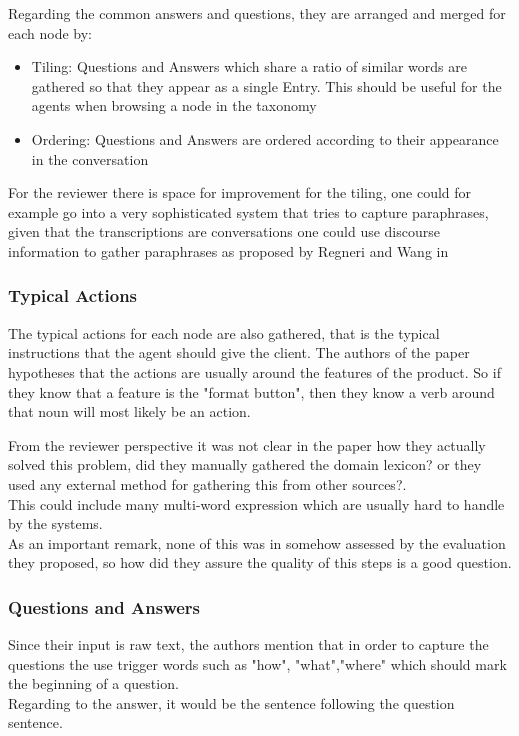 \documentclass[4pt,a4paper,twocolumn]{article}
\begin{document}
Regarding the common answers and questions, they are arranged and merged for each node by:
\begin{itemize}
	\item Tiling:  Questions and Answers which share a ratio of similar words are gathered so that they appear as a single
				  Entry. This should be useful for the agents when browsing a node in the taxonomy
	\item Ordering: Questions and Answers are ordered according to their appearance in the conversation
\end{itemize}


For the reviewer there is space for improvement for the tiling, one could for example go into a very sophisticated system that tries to capture paraphrases, given that the transcriptions are conversations one could use discourse information to gather paraphrases as proposed by Regneri and Wang in ~\cite{pub6382}

\subsubsection*{Typical Actions}
The typical actions for each node are also gathered, that is the typical instructions that the agent should give the client.
The authors of the paper hypotheses that the actions are usually around the features of the product. So if they know that a feature is the "format button", then they know a verb around that noun will most likely  be an action.

From the reviewer perspective it was not clear in the paper how they actually solved this problem, did they manually gathered the domain lexicon? or they used any external method for gathering this from other sources?.\\
This could include many multi-word expression which are usually hard to handle by the systems.\\
As an important remark, none of this was in somehow assessed by the evaluation they proposed, so how did they assure the quality of this steps is a  good question.


\subsubsection*{Questions and Answers}
Since their input is raw text, the authors mention that in order to capture the questions the use trigger words such as "how", "what","where" which should mark the beginning of a question.\\
Regarding to the answer, it would be the sentence following the question sentence.
\end{document}
